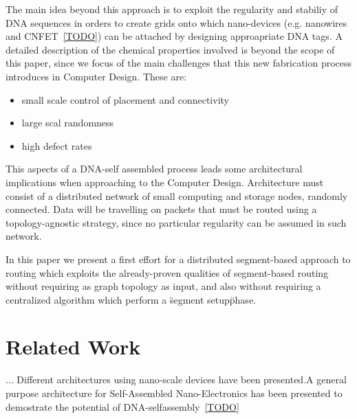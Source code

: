 \documentclass[conference]{IEEEtran}
\begin{document}
The main idea beyond this approach is to exploit the regularity and
stabiliy of DNA sequences in orders to create grids onto which
nano-devices (e.g. nanowires and CNFET~\ref{TODO}) can be attached by
designing approapriate DNA tags. A detailed description of the
chemical properties involved is beyond the scope of this paper, since
we focus of the main challenges that this new fabrication process
introduces in Computer Design. These are:
\begin{itemize}
\item small scale control of placement and connectivity
\item large scal randomness
\item high defect rates
\end{itemize}


This aspects of a DNA-self assembled process leads some architectural implications
when approaching to the Computer Design. Architecture must consist of
a distributed network of small computing and storage nodes, randomly
connected. Data will be travelling on packets that must be routed
using a topology-agnostic strategy, since no particular regularity can
be assumed in such network. 

In this paper we present a first effort for a distributed
segment-based approach to routing which exploits the already-proven
qualities of segment-based routing without requiring as graph
topology as input, and also without requiring a centralized algorithm
which perform a \"segment setup\" phase.




\section{Related Work}
...
Different architectures using nano-scale devices have been presented.A
general purpose architecture for Self-Assembled Nano-Electronics has
been presented to demostrate the potential of
DNA-selfassembly~\ref{TODO}

\end{document}
